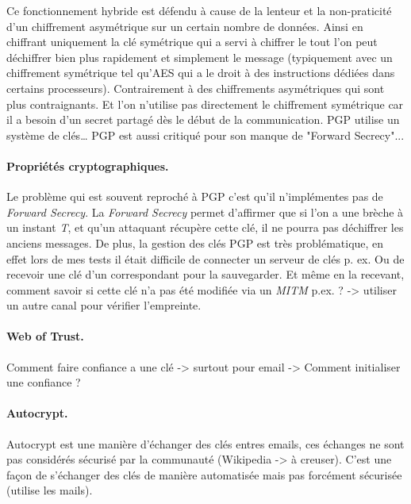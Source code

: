\noindent Ce fonctionnement hybride est défendu à cause de la lenteur et la non-praticité d’un chiffrement asymétrique sur un certain nombre de données. Ainsi en chiffrant uniquement la clé symétrique qui a servi à chiffrer le tout l’on peut déchiffrer bien plus rapidement et simplement le message (typiquement avec un chiffrement symétrique tel qu’AES qui a le droit à des instructions dédiées dans certains processeurs). Contrairement à des chiffrements asymétriques qui sont plus contraignants. Et l'on n'utilise pas directement le chiffrement symétrique car il a besoin d'un secret partagé dès le début de la communication.
PGP utilise un système de clés… PGP est aussi critiqué pour son manque de "Forward Secrecy"...
\paragraph*{Propriétés cryptographiques.}
Le problème qui est souvent reproché à PGP c'est qu'il n'implémentes pas de \textit{Forward Secrecy}. La \textit{Forward Secrecy} permet d'affirmer que si l'on a une brèche à un instant \textit{T}, et qu'un attaquant récupère cette clé, il ne pourra pas déchiffrer les anciens messages.
De plus, la gestion des clés PGP est très problématique, en effet lors de mes tests il était difficile de connecter un serveur de clés p. ex. Ou de recevoir une clé d'un correspondant pour la sauvegarder. Et même en la recevant, comment savoir si cette clé n'a pas été modifiée via un \textit{MITM} p.ex. ? -> utiliser un autre canal pour vérifier l'empreinte.
\paragraph*{Web of Trust.}
Comment faire confiance a une clé -> surtout pour email -> Comment initialiser une confiance ?
\paragraph*{Autocrypt.}
Autocrypt est une manière d'échanger des clés entres emails, ces échanges ne sont pas considérés sécurisé par la communauté (Wikipedia -> à creuser). C'est une façon de s'échanger des clés de manière automatisée mais pas forcément sécurisée (utilise les mails).
